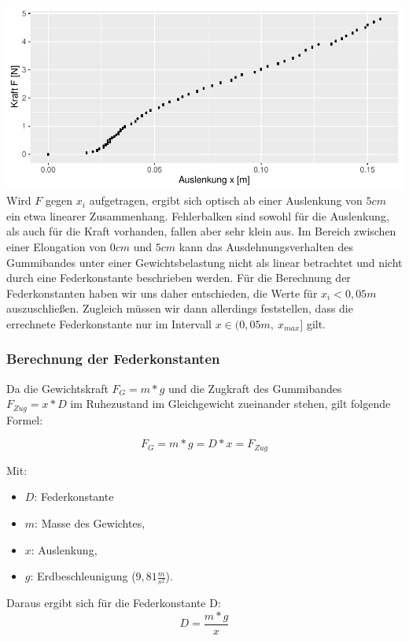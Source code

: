 \documentclass[
  9pt,
]{article}
\providecommand{\tightlist}{%
  \setlength{\itemsep}{0pt}\setlength{\parskip}{0pt}}
\begin{document}
\includegraphics{DehnbareStoffe_files/figure-latex/unnamed-chunk-6-1.pdf}
Wird \(F\) gegen \(x_i\) aufgetragen, ergibt sich optisch ab einer
Auslenkung von \(5cm\) ein etwa linearer Zusammenhang. Fehlerbalken sind
sowohl für die Auslenkung, als auch für die Kraft vorhanden, fallen aber
sehr klein aus. Im Bereich zwischen einer Elongation von \(0cm\) und
\(5cm\) kann das Ausdehnungsverhalten des Gummibandes unter einer
Gewichtsbelastung nicht als linear betrachtet und nicht durch eine
Federkonstante beschrieben werden. Für die Berechnung der
Federkonstanten haben wir uns daher entschieden, die Werte für
\(x_i<0,05m\) auszuschließen. Zugleich müssen wir dann allerdings
feststellen, dass die errechnete Federkonstante nur im Intervall
\(x \in (0,05m,\ x_{max}]\) gilt.

\hypertarget{berechnung-der-federkonstanten}{%
\subsubsection{Berechnung der
Federkonstanten}\label{berechnung-der-federkonstanten}}

Da die Gewichtskraft \(F_G=m*g\) und die Zugkraft des Gummibandes
\(F_{Zug} = x * D\) im Ruhezustand im Gleichgewicht zueinander stehen,
gilt folgende Formel:

\[F_G = m * g = D*x = F_{Zug}\]

Mit:

\begin{itemize}
\tightlist
\item
  \(D\): Federkonstante
\item
  \(m\): Masse des Gewichtes,
\item
  \(x\): Auslenkung,
\item
  \(g\): Erdbeschleunigung (\(9,81\frac{m}{s^2}\)).
\end{itemize}

Daraus ergibt sich für die Federkonstante D:
\begin{equation}\label{hook:eq:Federkonstante}
  D =\frac{m*g}{x}
\end{equation}
\end{document}
